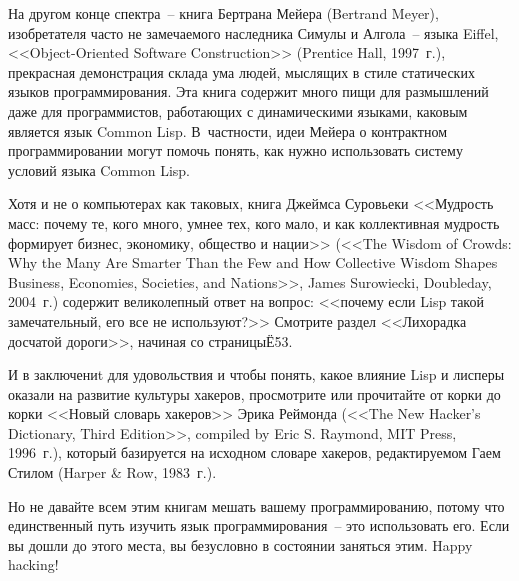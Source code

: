 На другом конце спектра~-- книга Бертрана Мейера (Bertrand Meyer), изобретателя часто не
замечаемого наследника Симулы и Алгола~-- языка Eiffel, <<Object-Oriented Software
Construction>> (Prentice Hall, 1997~г.), прекрасная демонстрация склада ума людей, мыслящих в
стиле статических языков программирования. Эта книга содержит много пищи для размышлений
даже для программистов, работающих с динамическими языками, каковым является язык Common
Lisp.  В~частности, идеи Мейера о контрактном программировании могут помочь понять, как
нужно использовать систему условий языка Common Lisp.

Хотя и не о компьютерах как таковых, книга Джеймса Суровьеки <<Мудрость масс: почему те,
кого много, умнее тех, кого мало, и как коллективная мудрость формирует бизнес, экономику,
общество и нации>> (<<The Wisdom of Crowds: Why the Many Are Smarter Than the Few and How
Collective Wisdom Shapes Business, Economies, Societies, and Nations>>, James Surowiecki,
Doubleday, 2004~г.) содержит великолепный ответ на вопрос: <<почему если Lisp такой
замечательный, его все не используют?>> Смотрите раздел <<Лихорадка досчатой дороги>>,
начиная со страницыЁ53.

И в заключениt для удовольствия и чтобы понять, какое влияние Lisp и лисперы оказали на
развитие культуры хакеров, просмотрите или прочитайте от корки до корки <<Новый словарь
хакеров>> Эрика Реймонда (<<The New Hacker's Dictionary, Third Edition>>, compiled by Eric
S. Raymond, MIT Press, 1996~г.), который базируется на исходном словаре хакеров, редактируемом
Гаем Стилом (Harper \& Row, 1983~г.).

Но не давайте всем этим книгам мешать вашему программированию, потому что единственный
путь изучить язык программирования~-- это использовать его. Если вы дошли до этого места,
вы безусловно в состоянии заняться этим.  Happy hacking!


